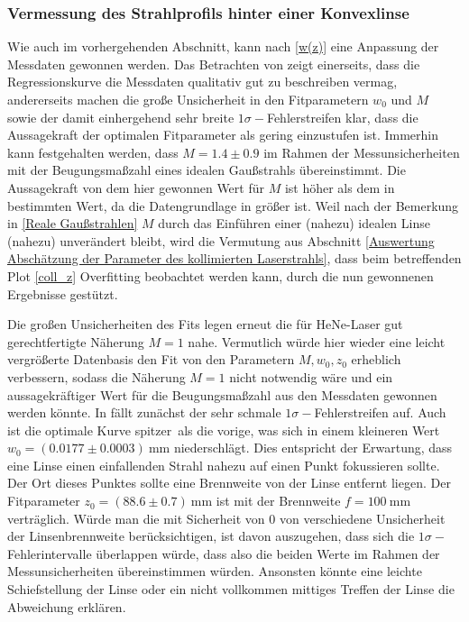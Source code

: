 \documentclass[11pt,a4paper,oneside]{scrartcl}
\begin{document}
\subsubsection{Vermessung des Strahlprofils hinter einer Konvexlinse}\label{Auswertung Vermessung des Strahlprofils hinter einer Konvexlinse}
Wie auch im vorhergehenden Abschnitt, kann nach \ref{w(z)} eine Anpassung der Messdaten gewonnen werden. 
Das Betrachten von  zeigt einerseits, dass die Regressionskurve die Messdaten qualitativ gut zu beschreiben vermag, andererseits machen die große Unsicherheit in den Fitparametern $w_0$ und $M$ sowie der damit einhergehend sehr breite $1\sigma-$Fehlerstreifen klar, dass die Aussagekraft der optimalen Fitparameter als gering einzustufen ist. Immerhin kann festgehalten werden, dass $M=1.4\pm0.9$ im Rahmen der Messunsicherheiten mit der Beugungsmaßzahl eines idealen Gaußstrahls übereinstimmt. Die Aussagekraft von dem hier gewonnen Wert für $M$ ist höher als dem in  bestimmten Wert, da die Datengrundlage in  größer ist. Weil nach der Bemerkung in \ref{Reale Gaußstrahlen} $M$ durch das Einführen einer (nahezu) idealen Linse (nahezu) unverändert bleibt, wird die Vermutung aus Abschnitt \ref{Auswertung Abschätzung der Parameter des kollimierten Laserstrahls}, dass beim betreffenden Plot \ref{coll_z} Overfitting beobachtet werden kann, durch die nun gewonnenen Ergebnisse gestützt.\par
Die großen Unsicherheiten des Fits legen erneut die für HeNe-Laser gut gerechtfertigte Näherung $M=1$ nahe. Vermutlich würde hier wieder eine leicht vergrößerte Datenbasis den Fit von den Parametern $M,w_0,z_0$ erheblich verbessern, sodass die Näherung $M=1$ nicht notwendig wäre und ein aussagekräftiger Wert für die Beugungsmaßzahl aus den Messdaten gewonnen werden könnte. 
In  fällt zunächst der sehr schmale $1\sigma-$Fehlerstreifen auf. Auch ist die optimale Kurve \glqq spitzer\grqq\ als die vorige, was sich in einem kleineren Wert $w_0=(0.0177\pm0.0003)\ \mathrm{mm}$ niederschlägt. Dies entspricht der Erwartung, dass eine Linse einen einfallenden Strahl nahezu auf einen Punkt fokussieren sollte. Der Ort dieses Punktes sollte eine Brennweite von der Linse entfernt liegen. Der Fitparameter $z_0=(88.6\pm0.7)\ \mathrm{mm}$ ist mit der Brennweite $f=100\ \mathrm{mm}$ verträglich. Würde man die mit Sicherheit von $0$ von verschiedene Unsicherheit der Linsenbrennweite berücksichtigen, ist davon auszugehen, dass sich die $1\sigma-$Fehlerintervalle überlappen würde, dass also die beiden Werte im Rahmen der Messunsicherheiten übereinstimmen würden. Ansonsten könnte eine leichte Schiefstellung der Linse oder ein nicht vollkommen mittiges Treffen der Linse die Abweichung erklären. \\
\end{document}
